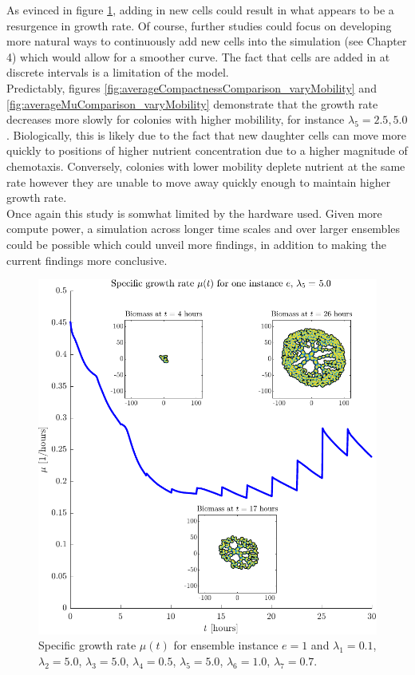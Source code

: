 As evinced in figure \ref{fig:MuSingleInstance5.0}, adding in new cells 
could result in what appears to be a resurgence in growth rate. Of course,
further studies could focus on developing more natural ways to continuously add new cells into the 
simulation (see Chapter 4) which would allow for a smoother curve.
The fact that cells are added in at discrete intervals is a limitation of the model.
\\

Predictably, figures \ref{fig:averageCompactnessComparison_varyMobility} 
and \ref{fig:averageMuComparison_varyMobility} demonstrate 
that the growth rate decreases more slowly for colonies with higher 
mobilility, for instance $\lambda_5 = 2.5, 5.0$. Biologically,
this is likely due to the fact that new daughter cells can move more
quickly to positions of higher nutrient concentration due to a 
higher magnitude of chemotaxis. Conversely, colonies with lower mobility
deplete nutrient at the same rate however they are 
unable to move away quickly enough to maintain higher growth rate.
\\

Once again this study is somwhat limited by the hardware used. 
Given more compute power, a simulation across longer time scales and 
over larger ensembles could be 
possible which could unveil more findings, in addition to 
making the current findings more conclusive.


\begin{figure}[!htb]
    \centering
    \includegraphics[width= \textwidth]{
        chapter4/figures/Inset_L1_0o10_L2_5o00_L3_5o00_L4_0o50_L5_5o00_L6_1o00_L7_0o70.pdf}
    \caption{Specific growth rate $\mu(t)$ for ensemble instance $e = 1$ and 
             $\lambda_1 = 0.1$,  
             $\lambda_2 = 5.0$, 
             $\lambda_3 = 5.0$, 
             $\lambda_4 = 0.5$, 
             $\lambda_5 = 5.0$, 
             $\lambda_6 = 1.0$, 
             $\lambda_7 = 0.7$.}
    \label{fig:MuSingleInstance5.0}
\end{figure}

